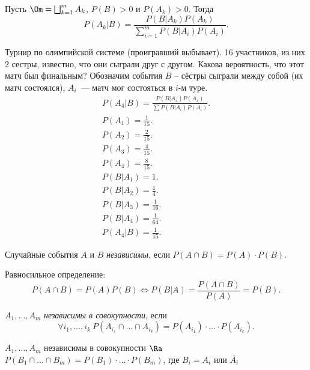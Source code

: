  \begin{theorem}[Байеса]
Пусть $\Om = \bigsqcup_{k=1}^m{A_k}$, $P(B) > 0$ и $P(A_k) > 0$. Тогда
     $$P(A_k|B) = \frac{P(B|A_k)P(A_k)}{\sum_{i=1}^m P(B|A_i)P(A_i)}.$$
 \end{theorem}

 \begin{example} Турнир по олимпийской системе (проигравший выбывает). 16 участников, из них 2 сестры, известно, что они сыграли друг с другом.
     Какова вероятность, что этот матч был финальным? Обозначим события $B$ -- сёстры сыграли между собой (их матч состоялся), $A_i$~--- матч мог состояться в $i$-м туре.
    \begin{gather*}
        P(A_4|B) = \frac{P(B|A_4)P(A_4)}{\sum P(B|A_i)P(A_i)}.\\
        P(A_1) = \frac{1}{15}.\\
        P(A_2) = \frac{2}{15}.\\
        P(A_3) = \frac{4}{15}.\\
        P(A_4) = \frac{8}{15}.\\
        P(B|A_1) = 1.\\
        P(B|A_2) = \frac{1}{4}.\\
        P(B|A_3) = \frac{1}{16}.\\
        P(B|A_4) = \frac{1}{64}.\\
        P(A_4|B)  = \frac{1}{15}.
    \end{gather*}
 \end{example}

 \begin{definition}
     Случайные события $A$ и $B$ \textit{независимы}, если $P(A \cap B) = P(A)\cdot P(B)$.
 \end{definition}
 Равносильное определение:
 $$P(A \cap B) = P(A) P(B) \iff P(B|A) = \frac{P(A\cap B)}{P(A)} = P(B).$$
 \begin{definition}
     $A_1, \ldots, A_m$ \textit{независимы в совокупности}, если
     $$\forall{i_1, \ldots, i_k}\ P(A_{i_1}\cap\ldots\cap A_{i_k})=P(A_{i_1})\cdot\ldots\cdot P(A_{i_k}).$$
 \end{definition}

 \begin{lemma}\label{ex:nez}
     $A_1, \ldots , A_m$ независимы в совокупности $\Ra$
     $P(B_1\cap\ldots \cap B_m)=P(B_1)\cdot\ldots \cdot P(B_m)$, где $B_i = A_i$ или $\overline{A_i}$
 \end{lemma}
 

